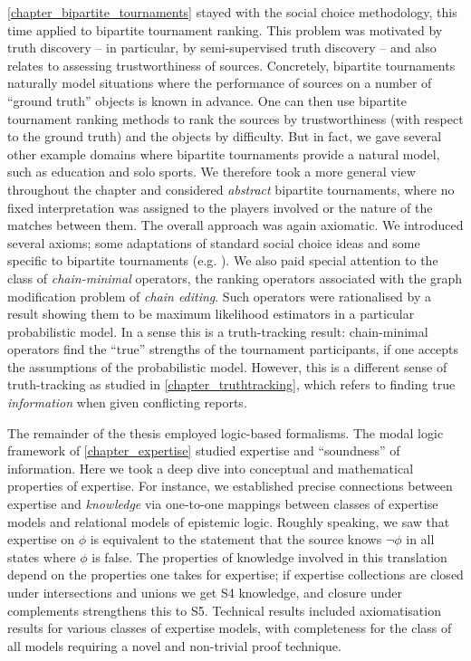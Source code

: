 {
    

\cref{chapter_bipartite_tournaments} stayed with the social choice methodology,
this time applied to bipartite tournament ranking. This problem was motivated
by truth discovery -- in particular, by semi-supervised truth discovery -- and
also relates to assessing trustworthiness of sources. Concretely, bipartite
tournaments naturally model situations where the performance of sources on a
number of ``ground truth'' objects is known in advance. One can then use
bipartite tournament ranking methods to rank the sources by trustworthiness
(with respect to the ground truth) and the objects by difficulty. But in fact,
we gave several other example domains where bipartite tournaments provide a
natural model, such as education and solo sports. We therefore took a more
general view throughout the chapter and considered \emph{abstract} bipartite
tournaments, where no fixed interpretation was assigned to the players involved
or the nature of the matches between them. The overall approach was again
axiomatic.  We introduced several axioms; some adaptations of standard social
choice ideas and some specific to bipartite tournaments (e.g. \dualaxiom). We
also paid special attention to the class of \emph{chain-minimal} operators, the
ranking operators associated with the graph modification problem of \emph{chain
editing}. Such operators were rationalised by a result showing them to be
maximum likelihood estimators in a particular probabilistic model. In a sense
this is a truth-tracking result: chain-minimal operators find the ``true''
strengths of the tournament participants, if one accepts the assumptions of the
probabilistic model. However, this is a different sense of truth-tracking as
studied in \cref{chapter_truthtracking}, which refers to finding true
\emph{information} when given conflicting reports.

}

The remainder of the thesis employed logic-based formalisms. The modal logic
framework of \cref{chapter_expertise} studied expertise and ``soundness'' of
information. Here we took a deep dive into conceptual and mathematical
properties of expertise. For instance, we established precise connections
between expertise and \emph{knowledge} via one-to-one mappings between classes
of expertise models and relational models of epistemic logic. Roughly speaking,
we saw that expertise on $\phi$ is equivalent to the statement that the source
knows $\neg\phi$ in all states where $\phi$ is false. The properties of
knowledge involved in this translation depend on the properties one takes for
expertise; if expertise collections are closed under intersections and unions
we get S4 knowledge, and closure under complements strengthens this to S5.
Technical results included axiomatisation results for various classes of
expertise models, with completeness for the class of all models requiring a
novel and non-trivial proof technique.

